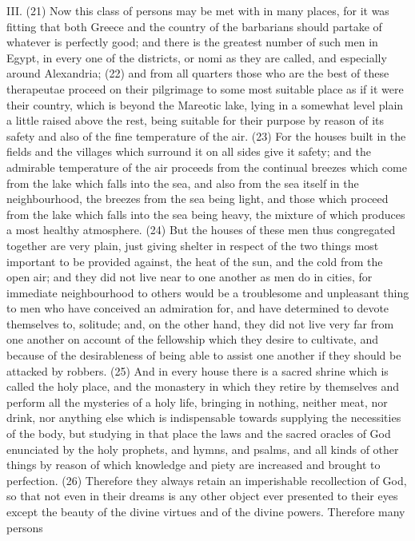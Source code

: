 III. (21) Now this class of persons may be met with in many places, for it was fitting that both
Greece and the country of the barbarians should partake of whatever is perfectly good; and there
is the greatest number of such men in Egypt, in every one of the districts, or nomi as they are
called, and especially around Alexandria; (22) and from all quarters those who are the best of
these therapeutae proceed on their pilgrimage to some most suitable place as if it were their
country, which is beyond the Mareotic lake, lying in a somewhat level plain a little raised above the
rest, being suitable for their purpose by reason of its safety and also of the fine temperature of the
air. (23) For the houses built in the fields and the villages which surround it on all sides give it
safety; and the admirable temperature of the air proceeds from the continual breezes which come
from the lake which falls into the sea, and also from the sea itself in the neighbourhood, the
breezes from the sea being light, and those which proceed from the lake which falls into the sea
being heavy, the mixture of which produces a most healthy atmosphere. (24) But the houses of
these men thus congregated together are very plain, just giving shelter in respect of the two things
most important to be provided against, the heat of the sun, and the cold from the open air; and they
did not live near to one another as men do in cities, for immediate neighbourhood to others would
be a troublesome and unpleasant thing to men who have conceived an admiration for, and have
determined to devote themselves to, solitude; and, on the other hand, they did not live very far from
one another on account of the fellowship which they desire to cultivate, and because of the
desirableness of being able to assist one another if they should be attacked by robbers. (25) And
in every house there is a sacred shrine which is called the holy place, and the monastery in which
they retire by themselves and perform all the mysteries of a holy life, bringing in nothing, neither
meat, nor drink, nor anything else which is indispensable towards supplying the necessities of the
body, but studying in that place the laws and the sacred oracles of God enunciated by the holy
prophets, and hymns, and psalms, and all kinds of other things by reason of which knowledge and
piety are increased and brought to perfection. (26) Therefore they always retain an imperishable
recollection of God, so that not even in their dreams is any other object ever presented to their
eyes except the beauty of the divine virtues and of the divine powers. Therefore many persons
